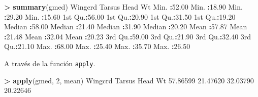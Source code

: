 \documentclass[
  a4paper,
  oneside]{scrbook}
\newenvironment{Shaded}{\begin{snugshade}}{\end{snugshade}}
\newcommand{\DecValTok}[1]{\textcolor[rgb]{0.00,0.00,0.81}{#1}}
\newcommand{\FloatTok}[1]{\textcolor[rgb]{0.00,0.00,0.81}{#1}}
\newcommand{\FunctionTok}[1]{\textcolor[rgb]{0.13,0.29,0.53}{\textbf{#1}}}
\newcommand{\NormalTok}[1]{#1}
\newcommand{\SpecialCharTok}[1]{\textcolor[rgb]{0.81,0.36,0.00}{\textbf{#1}}}
\theoremstyle{definition}
\theoremstyle{definition}
\theoremstyle{definition}
\theoremstyle{definition}
\theoremstyle{remark}
\begin{document}
\begin{Shaded}
\begin{Highlighting}[]
\SpecialCharTok{\textgreater{}} \FunctionTok{summary}\NormalTok{(gmed)}
\NormalTok{    Wingcrd          Tarsus           Head             Wt       }
\NormalTok{ Min.   }\SpecialCharTok{:}\FloatTok{52.00}\NormalTok{   Min.   }\SpecialCharTok{:}\FloatTok{18.90}\NormalTok{   Min.   }\SpecialCharTok{:}\FloatTok{29.20}\NormalTok{   Min.   }\SpecialCharTok{:}\FloatTok{15.60}  
 \DecValTok{1}\NormalTok{st Qu.}\SpecialCharTok{:}\FloatTok{56.00}   \DecValTok{1}\NormalTok{st Qu.}\SpecialCharTok{:}\FloatTok{20.90}   \DecValTok{1}\NormalTok{st Qu.}\SpecialCharTok{:}\FloatTok{31.50}   \DecValTok{1}\NormalTok{st Qu.}\SpecialCharTok{:}\FloatTok{19.20}  
\NormalTok{ Median }\SpecialCharTok{:}\FloatTok{58.00}\NormalTok{   Median }\SpecialCharTok{:}\FloatTok{21.40}\NormalTok{   Median }\SpecialCharTok{:}\FloatTok{31.90}\NormalTok{   Median }\SpecialCharTok{:}\FloatTok{20.20}  
\NormalTok{ Mean   }\SpecialCharTok{:}\FloatTok{57.87}\NormalTok{   Mean   }\SpecialCharTok{:}\FloatTok{21.48}\NormalTok{   Mean   }\SpecialCharTok{:}\FloatTok{32.04}\NormalTok{   Mean   }\SpecialCharTok{:}\FloatTok{20.23}  
 \DecValTok{3}\NormalTok{rd Qu.}\SpecialCharTok{:}\FloatTok{59.00}   \DecValTok{3}\NormalTok{rd Qu.}\SpecialCharTok{:}\FloatTok{21.90}   \DecValTok{3}\NormalTok{rd Qu.}\SpecialCharTok{:}\FloatTok{32.40}   \DecValTok{3}\NormalTok{rd Qu.}\SpecialCharTok{:}\FloatTok{21.10}  
\NormalTok{ Max.   }\SpecialCharTok{:}\FloatTok{68.00}\NormalTok{   Max.   }\SpecialCharTok{:}\FloatTok{25.40}\NormalTok{   Max.   }\SpecialCharTok{:}\FloatTok{35.70}\NormalTok{   Max.   }\SpecialCharTok{:}\FloatTok{26.50}  
\end{Highlighting}
\end{Shaded}

\normalsize

A través de la función \texttt{apply}.

\footnotesize

\begin{Shaded}
\begin{Highlighting}[]
\SpecialCharTok{\textgreater{}} \FunctionTok{apply}\NormalTok{(gmed, }\DecValTok{2}\NormalTok{, mean)}
\NormalTok{ Wingcrd   Tarsus     Head       Wt }
\FloatTok{57.86599} \FloatTok{21.47620} \FloatTok{32.03790} \FloatTok{20.22646} 
\end{Highlighting}
\end{Shaded}

\normalsize
\end{document}
